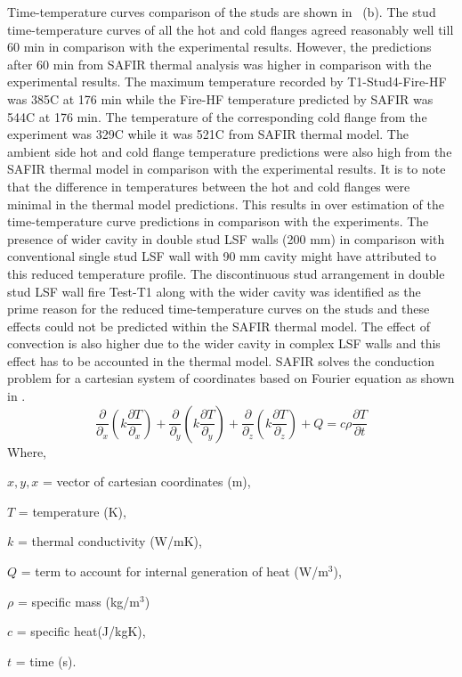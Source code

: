 Time-temperature curves comparison of the studs are shown in ~(b). The stud time-temperature curves of all the hot and cold flanges agreed reasonably well till 60 min in comparison with the experimental results. However, the predictions after 60 min from SAFIR thermal analysis was higher in comparison with the experimental results. The maximum temperature recorded by T1-Stud4-Fire-HF was 385\degree C at 176 min while the Fire-HF temperature predicted by SAFIR was 544\degree C at 176 min. The temperature of the corresponding cold flange from the experiment was 329\degree C while it was 521\degree C from SAFIR thermal model. The ambient side hot and cold flange temperature predictions were also high from the SAFIR thermal model in comparison with the experimental results. It is to note that the difference in temperatures between the hot and cold flanges were minimal in the thermal model predictions. This results in over estimation of the time-temperature curve predictions in comparison with the experiments. The presence of wider cavity in double stud LSF walls (200 mm) in comparison with conventional single stud LSF wall with 90 mm cavity might have attributed to this reduced temperature profile. The discontinuous stud arrangement in double stud LSF wall fire Test-T1 along with the wider cavity was identified as the prime reason for the reduced time-temperature curves on the studs and these effects could not be predicted within the SAFIR thermal model. The effect of convection is also higher due to the wider cavity in complex LSF walls and this effect has to be accounted in the thermal model. SAFIR solves the conduction problem for a cartesian system of coordinates based on Fourier equation as shown in .
\begin{equation}\label{eq:safir-conduction}
	\dfrac{\partial}{\partial_x}\left(k\dfrac{\partial T}{\partial_x}\right)+\dfrac{\partial}{\partial_y}\left(k\dfrac{\partial T}{\partial_y}\right)+\dfrac{\partial}{\partial_z}\left(k\dfrac{\partial T}{\partial_z}\right)+Q=c\rho\dfrac{\partial T}{\partial t}
\end{equation}
Where,
\begin{description}[itemsep=0pt,parsep=0pt]
	\item $x,y,x$ = vector of cartesian coordinates (m),
	\item $T$ = temperature (K),
	\item $k$ = thermal conductivity (W/mK),
	\item $Q$ = term to account for internal generation of heat (W/m$^3$),
	\item $\rho$ = specific mass (kg/m$^3$)
	\item $c$ = specific heat(J/kgK),
	\item $t$ = time (s).
\end{description}

